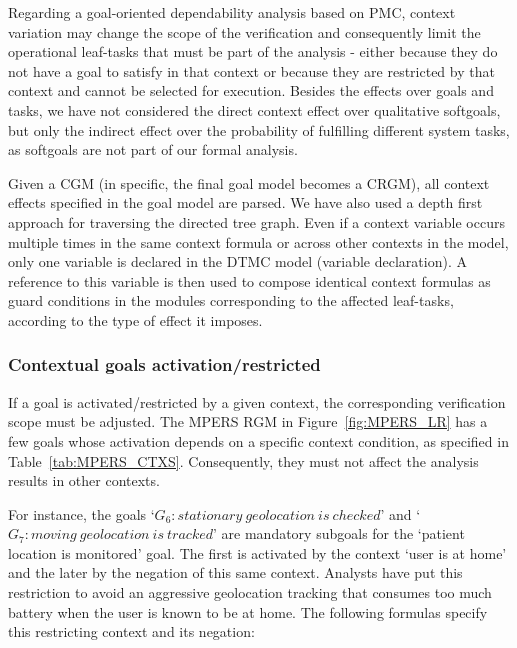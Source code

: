 Regarding a goal-oriented dependability analysis based on PMC, context variation may change the scope of the verification and consequently limit the operational leaf-tasks that must be part of the analysis - either because they do not have a goal to satisfy in that context or because they are restricted by that context and cannot be selected for execution. Besides the effects over goals and tasks, we have not considered the direct context effect over qualitative softgoals, but only the indirect effect over the probability of fulfilling different system tasks, as softgoals are not part of our formal analysis.

Given a CGM (in specific, the final goal model becomes a CRGM), all context effects specified in the goal model are parsed. We have also used a depth first approach for traversing the directed tree graph. Even if a context variable occurs multiple times in the same context formula or across other contexts in the model, only one variable is declared in the DTMC model (variable declaration). A reference to this variable is then used to compose identical context formulas as guard conditions in the modules corresponding to the affected leaf-tasks, according to the type of effect it imposes.



\subsubsection{Contextual goals activation/restricted}

If a goal is activated/restricted by a given context, the corresponding verification scope must be adjusted. The MPERS RGM in Figure~\ref{fig:MPERS_LR} has a few goals whose activation depends on a specific context condition, as specified in Table~\ref{tab:MPERS_CTXS}. Consequently, they must not affect the analysis results in other contexts.

For instance, the goals `$G_6: stationary\ geolocation\ is\ checked$' and `$G_7: moving\ geolocation\ is\ tracked$' are mandatory subgoals for the `patient location is monitored' goal. The first is activated by the context `user is at home' and the later by the negation of this same context. Analysts have put this restriction to avoid an aggressive geolocation tracking that consumes too much battery when the user is known to be at home. The following formulas specify this restricting context and its negation:

